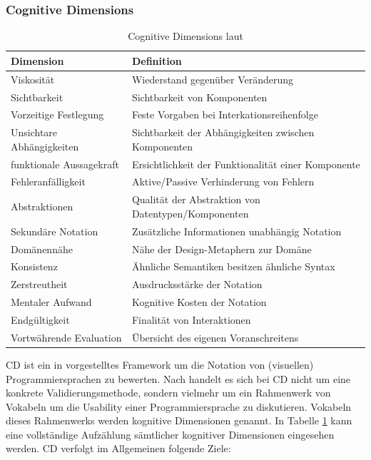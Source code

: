 \subsubsection{Cognitive Dimensions}
\begin{table}[h]
\centering
\begin{tabularx}{\textwidth}{lX}
\hline
\rowcolor[HTML]{EFEFEF} 
Dimension                 & Definition                                           \\ \hline
Viskosität                & Wiederstand gegenüber Veränderung                    \\ \hline
Sichtbarkeit              & Sichtbarkeit von Komponenten                         \\ \hline
Vorzeitige Festlegung     & Feste Vorgaben bei Interkationsreihenfolge           \\ \hline
Unsichtare Abhängigkeiten & Sichtbarkeit der Abhängigkeiten zwischen Komponenten \\ \hline
funktionale Aussagekraft  & Ersichtlichkeit der Funktionalität einer Komponente  \\ \hline
Fehleranfälligkeit        & Aktive/Passive Verhinderung von Fehlern              \\ \hline
Abstraktionen             & Qualität der Abstraktion von Datentypen/Komponenten  \\ \hline
Sekundäre Notation        & Zusätzliche Informationen unabhängig Notation        \\ \hline
Domänennähe               & Nähe der Design-Metaphern zur Domäne                 \\ \hline
Konsistenz                & Ähnliche Semantiken besitzen ähnliche Syntax         \\ \hline
Zerstreutheit             & Ausdrucksstärke der Notation                         \\ \hline
Mentaler Aufwand          & Kognitive Kosten der Notation                        \\ \hline
Endgültigkeit             & Finalität von Interaktionen                          \\ \hline
Vortwährende Evaluation   & Übersicht des eigenen Voranschreitens                \\ \hline
\end{tabularx}
\caption{Cognitive Dimensions laut \cite{blackwell2003notational}}
\label{tab:cognitivedimensions}
\end{table}
\acl{CD} ist ein in \cite{blackwell2003notational} vorgestelltes Framework um die Notation von (visuellen) Programmiersprachen zu bewerten. Nach \cite{blackwell2003notational} handelt es sich bei \ac{CD} nicht um eine konkrete Validierungsmethode, sondern vielmehr um ein Rahmenwerk von Vokabeln um die Usability einer Programmiersprache zu diskutieren. Vokabeln dieses Rahmenwerks werden kognitive Dimensionen genannt. In Tabelle \ref{tab:cognitivedimensions} kann eine vollständige Aufzählung sämtlicher kognitiver Dimensionen eingesehen werden. \ac{CD} verfolgt im Allgemeinen folgende Ziele:

